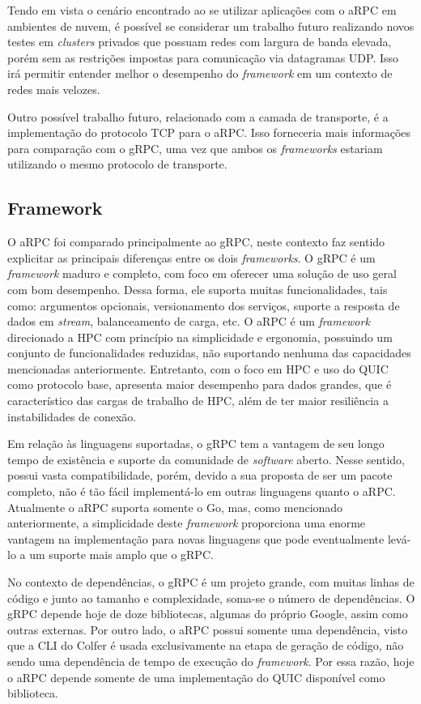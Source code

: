 Tendo em vista o cenário encontrado ao se utilizar aplicações com o aRPC em ambientes de nuvem, é possível se considerar um trabalho futuro realizando novos testes em \textit{clusters} privados que possuam redes com largura de banda elevada, porém sem as restrições impostas para comunicação via datagramas UDP. Isso irá permitir entender melhor o desempenho do \textit{framework} em um contexto de redes mais velozes.

Outro possível trabalho futuro, relacionado com a camada de transporte, é a implementação do protocolo TCP para o aRPC. Isso forneceria mais informações para comparação com o gRPC, uma vez que ambos os \textit{frameworks} estariam utilizando o mesmo protocolo de transporte.


\subsection{Framework}

O aRPC foi comparado principalmente ao gRPC, neste contexto faz sentido explicitar as principais diferenças entre os dois \textit{frameworks}. O gRPC é um \emph{framework} maduro e completo, com foco em oferecer uma solução de uso geral com bom desempenho. Dessa forma, ele suporta muitas funcionalidades, tais como: argumentos opcionais, versionamento dos serviços, suporte a resposta de dados em \textit{stream}, balanceamento de carga, etc. O aRPC é um \textit{framework} direcionado a HPC com princípio na simplicidade e ergonomia, possuindo um conjunto de funcionalidades reduzidas, não suportando nenhuma das capacidades mencionadas anteriormente. Entretanto, com o foco em HPC e uso do QUIC como protocolo base, apresenta maior desempenho para dados grandes, que é característico das cargas de trabalho de HPC, além de ter maior resiliência a instabilidades de conexão.

Em relação às linguagens suportadas, o gRPC tem a vantagem de seu longo tempo de existência e suporte da comunidade de \textit{software} aberto. Nesse sentido, possui vasta compatibilidade, porém, devido a sua proposta de ser um pacote completo, não é tão fácil implementá-lo em outras linguagens quanto o aRPC. Atualmente o aRPC suporta somente o Go, mas, como mencionado anteriormente, a simplicidade deste \textit{framework} proporciona uma enorme vantagem na implementação para novas linguagens que pode eventualmente levá-lo a um suporte mais amplo que o gRPC.

No contexto de dependências, o gRPC é um projeto grande, com muitas linhas de código e junto ao tamanho e complexidade, soma-se o número de dependências. O gRPC depende hoje de doze bibliotecas, algumas do próprio Google, assim como outras externas. Por outro lado, o aRPC possui somente uma dependência, visto que a CLI do Colfer é usada exclusivamente na etapa de geração de código, não sendo uma dependência de tempo de execução do \textit{framework}. Por essa razão, hoje o aRPC depende somente de uma implementação do QUIC disponível como biblioteca.

